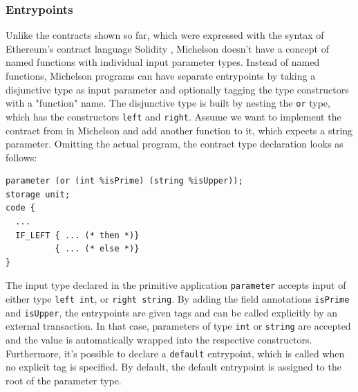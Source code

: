 \subsubsection{Entrypoints}
Unlike the contracts shown so far, which were expressed with the syntax of Ethereum's contract language Solidity \cite{solidity_docs}, Michelson doesn't have a concept of named functions with individual input parameter types. Instead of named functions, Michelson programs can have separate entrypoints by taking a disjunctive type as input parameter and optionally tagging the type constructors with a "function" name. The disjunctive type is built by nesting the \texttt{or} type, which has the constructors \texttt{left} and \texttt{right}. Assume we want to implement the contract from  in Michelson and add another function to it, which expects a string parameter. Omitting the actual program, the contract type declaration looks as follows:
\begin{lstlisting}[language=Michelson, numbers=none, caption=Michelson contract with two entrypoints, label=lst:entrypoints]
parameter (or (int %isPrime) (string %isUpper));
storage unit;
code {
  ...
  IF_LEFT { ... (* then *)}
          { ... (* else *)}
}
\end{lstlisting}
The input type declared in the primitive application \texttt{parameter} accepts input of either type \texttt{left int}, or \texttt{right string}. By adding the field annotations \texttt{isPrime} and \texttt{isUpper}, the entrypoints are given tags and can be called explicitly by an external transaction. In that case, parameters of type \texttt{int} or \texttt{string} are accepted and the value is automatically wrapped into the respective constructors. Furthermore, it's possible to declare a \texttt{default} entrypoint, which is called when no explicit tag is specified. By default, the default entrypoint is assigned to the root of the parameter type. \cite{tezos_docs}

